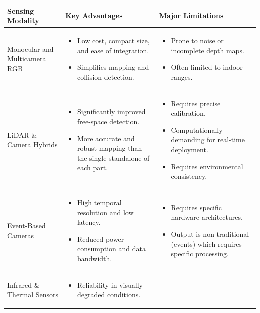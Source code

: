 \begin{table}[H]
\centering
\setlength{\tabcolsep}{4pt} %
\begin{tabular}{p{2.5cm} p{5cm} p{5cm}} %
\hline
\textbf{Sensing Modality} & \textbf{Key Advantages} & \textbf{Major Limitations} \\
\hline
Monocular and Multicamera RGB &
\begin{itemize}
  \item Low cost, compact size, and ease of integration.
  \item Simplifies mapping and collision detection.
\end{itemize} &
\begin{itemize}
  \item Prone to noise or incomplete depth maps.
  \item Often limited to indoor ranges.
\end{itemize} \\
\hline
LiDAR \& Camera Hybrids &
\begin{itemize}
  \item Significantly improved free-space detection.
  \item More accurate and robust mapping than the single standalone of each part.
\end{itemize} &
\begin{itemize}
  \item Requires precise calibration.
  \item Computationally demanding for real-time deployment.
  \item Requires environmental consistency.
\end{itemize} \\
\hline
Event-Based Cameras &
\begin{itemize}
  \item High temporal resolution and low latency.
  \item Reduced power consumption and data bandwidth.
\end{itemize} &
\begin{itemize}
  \item Requires specific hardware architectures.
  \item Output is non-traditional (events) which requires specific processing.
\end{itemize} \\
\hline
Infrared \& Thermal Sensors &
\begin{itemize}
  \item Reliability in visually degraded conditions.

\end{itemize}
\end{tabular}
\end{table}
